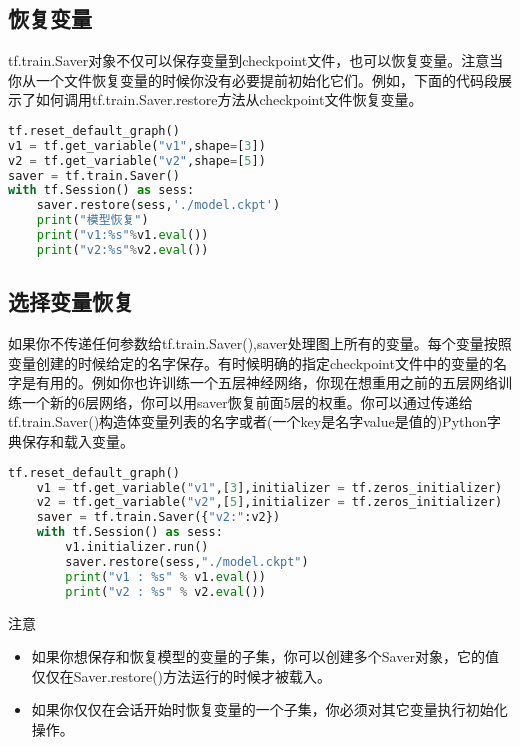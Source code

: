\subsection{恢复变量}
tf.train.Saver对象不仅可以保存变量到checkpoint文件，也可以恢复变量。注意当你从一个文件恢复变量的时候你没有必要提前初始化它们。例如，下面的代码段展示了如何调用tf.train.Saver.restore方法从checkpoint文件恢复变量。
\begin{lstlisting}[language=Python]
tf.reset_default_graph()
v1 = tf.get_variable("v1",shape=[3])
v2 = tf.get_variable("v2",shape=[5])
saver = tf.train.Saver()
with tf.Session() as sess:
    saver.restore(sess,'./model.ckpt')
    print("模型恢复")
    print("v1:%s"%v1.eval())
    print("v2:%s"%v2.eval())
\end{lstlisting}
\subsection{选择变量恢复}
如果你不传递任何参数给tf.train.Saver(),saver处理图上所有的变量。每个变量按照变量创建的时候给定的名字保存。有时候明确的指定checkpoint文件中的变量的名字是有用的。例如你也许训练一个五层神经网络，你现在想重用之前的五层网络训练一个新的6层网络，你可以用saver恢复前面5层的权重。你可以通过传递给tf.train.Saver()构造体变量列表的名字或者(一个key是名字value是值的)Python字典保存和载入变量。
\begin{lstlisting}[language=Python]
tf.reset_default_graph()
	v1 = tf.get_variable("v1",[3],initializer = tf.zeros_initializer)
	v2 = tf.get_variable("v2",[5],initializer = tf.zeros_initializer)
	saver = tf.train.Saver({"v2:":v2})
	with tf.Session() as sess:
	    v1.initializer.run()
	    saver.restore(sess,"./model.ckpt")
	    print("v1 : %s" % v1.eval())
	    print("v2 : %s" % v2.eval())
\end{lstlisting}
注意
\begin{itemize}
	\item 如果你想保存和恢复模型的变量的子集，你可以创建多个Saver对象，它的值仅仅在Saver.restore()方法运行的时候才被载入。
	\item 如果你仅仅在会话开始时恢复变量的一个子集，你必须对其它变量执行初始化操作。
\end{itemize}
